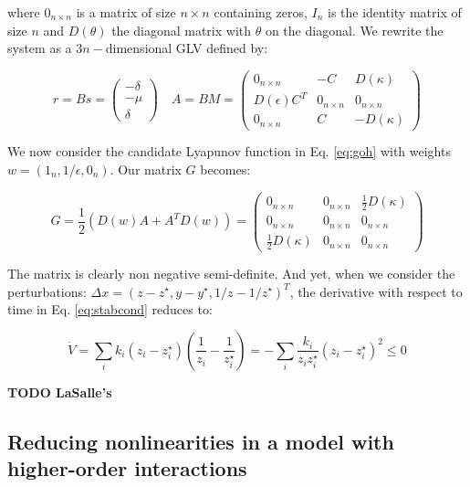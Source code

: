 \documentclass{article}
\begin{document}
where \(0_{n \times n}\) is a matrix of size \(n \times n\) containing
zeros, \(I_n\) is the identity matrix of size \(n\) and \(D(\theta)\)
the diagonal matrix with \(\theta\) on the diagonal. We rewrite the
system as a \(3n-\)dimensional GLV defined by:

\begin{equation}
r = B s = \begin{pmatrix}
-\delta \\
-\mu \\
\delta
\end{pmatrix} \quad
A = B M = \begin{pmatrix}
0_{n \times n} & -C & D(\kappa)\\
D(\epsilon) C^T & 0_{n \times n} & 0_{n \times n}\\
0_{n \times n} & C & -D(\kappa)
\end{pmatrix}
\end{equation}

We now consider the candidate Lyapunov function in Eq. \ref{eq:goh} with
weights \(w = (1_n, 1 / \epsilon, 0_n)\). Our matrix \(G\) becomes:

\begin{equation}
G = \frac{1}{2}(D(w) A + A^T D(w)) = \begin{pmatrix}
0_{n \times n} & 0_{n \times n} & \frac{1}{2} D(\kappa)\\
0_{n \times n} & 0_{n \times n} & 0_{n \times n}\\
\frac{1}{2} D(\kappa) & 0_{n \times n} & 0_{n \times n}
\end{pmatrix}
\end{equation}

The matrix is clearly non negative semi-definite. And yet, when we
consider the perturbations:
\(\Delta x = (z - z^\star, y - y^\star, 1 / z - 1 / z^\star)^T\), the
derivative with respect to time in Eq. \ref{eq:stabcond} reduces to:

\begin{equation}
\dot{V} = \sum_i k_i (z_i - z_i^\star) \left( \frac{1}{z_i} - \frac{1}{z_i^\star} \right) = - \sum_i \frac{k_i}{z_i z_i^\star} (z_i - z_i^\star)^2 \leq 0
\end{equation}

\textbf{TODO LaSalle's}

\hypertarget{reducing-nonlinearities-in-a-model-with-higher-order-interactions}{%
\subsection{Reducing nonlinearities in a model with higher-order
interactions}\label{reducing-nonlinearities-in-a-model-with-higher-order-interactions}}
\end{document}
